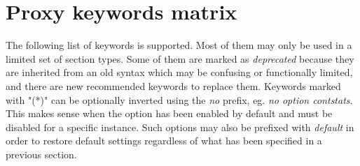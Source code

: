 
\section{Proxy keywords matrix}

The following list of keywords is supported. Most of them may only be used in a
limited set of section types. Some of them are marked as \emph{deprecated} because
they are inherited from an old syntax which may be confusing or functionally
limited, and there are new recommended keywords to replace them. Keywords
marked with "(*)" can be optionally inverted using the \emph{no} prefix, eg. \emph{no
option contstats}. This makes sense when the option has been enabled by default
and must be disabled for a specific instance. Such options may also be prefixed
with \emph{default} in order to restore default settings regardless of what has been
specified in a previous  section.

